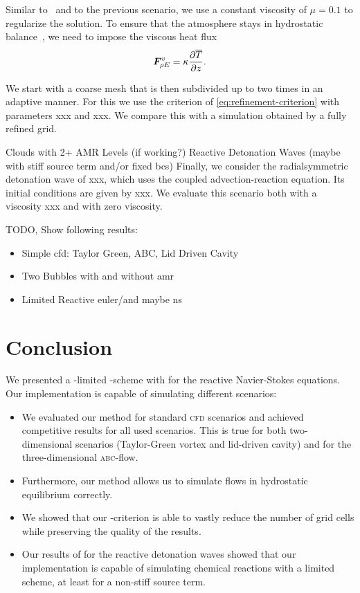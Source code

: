 \documentclass[runningheads]{llncs}
\begin{document}
Similar to~\cite{muller2010adaptive} and to the previous scenario, we use a constant viscosity of $\mu = 0.1$ to regularize the solution.
To ensure that the atmosphere stays in hydrostatic balance~\cite{giraldo2008study}, we need to impose the viscous heat flux
\begin{equation}
  \label{eq:atmosphere-bc}
  \viscFlux_{\QE} = \kappa \pdv{\overline{T}}{z}.%
\end{equation}

We start with a coarse mesh that is then subdivided up to two times in an adaptive manner.
For this we use the criterion of \cref{eq:refinement-criterion} with parameters xxx and xxx.
We compare this with a simulation obtained by a fully refined grid.

Clouds with 2+ AMR Levels (if working?)
Reactive Detonation Waves (maybe with stiff source term and/or fixed bcs)
Finally, we consider the radialsymmetric detonation wave of xxx, which uses the coupled advection-reaction equation.
Its initial conditions are given by xxx.
We evaluate this scenario both with a viscosity xxx and with zero viscosity.

TODO, Show following results:
\begin{itemize}
\item Simple cfd: Taylor Green, ABC, Lid Driven Cavity
\item Two Bubbles with and without amr
\item Limited Reactive euler/and maybe ns
\end{itemize}

\section{Conclusion}
We presented a \muscl{}-limited \aderdg{}-scheme with \amr{} for the reactive Navier-Stokes equations.
Our implementation is capable of simulating different scenarios:
\begin{itemize}
\item We evaluated our method for standard \textsc{cfd} scenarios and achieved competitive results for all used scenarios.
  This is true for both two-dimensional scenarios (Taylor-Green vortex and lid-driven cavity) and for the three-dimensional \textsc{abc}-flow.
\item Furthermore, our method allows us to simulate flows in hydrostatic equilibrium correctly.
\item We showed that our \amr{}-criterion is able to vastly reduce the number of grid cells while preserving the quality of the results.
\item Our results of for the reactive detonation waves showed that our implementation is capable of simulating chemical reactions with a limited scheme, at least for a non-stiff source term.
\end{itemize}

\printbibliography{}
\end{document}
